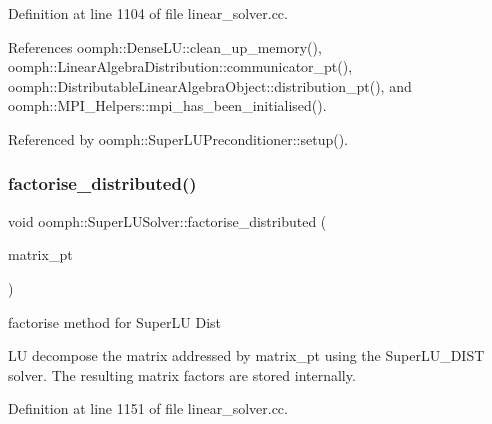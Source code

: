 Definition at line 1104 of file linear\+\_\+solver.\+cc.



References oomph\+::\+Dense\+L\+U\+::clean\+\_\+up\+\_\+memory(), oomph\+::\+Linear\+Algebra\+Distribution\+::communicator\+\_\+pt(), oomph\+::\+Distributable\+Linear\+Algebra\+Object\+::distribution\+\_\+pt(), and oomph\+::\+M\+P\+I\+\_\+\+Helpers\+::mpi\+\_\+has\+\_\+been\+\_\+initialised().



Referenced by oomph\+::\+Super\+L\+U\+Preconditioner\+::setup().

\mbox{\label{classoomph_1_1SuperLUSolver_ab60386fae7cd417ad62f46c3cb1463c0}} 
\subsubsection{\texorpdfstring{factorise\+\_\+distributed()}{factorise\_distributed()}}
{\footnotesize\ttfamily void oomph\+::\+Super\+L\+U\+Solver\+::factorise\+\_\+distributed (\begin{DoxyParamCaption}\item[{\hyperlink{classoomph_1_1DoubleMatrixBase}{Double\+Matrix\+Base} $\ast$const \&}]{matrix\+\_\+pt }\end{DoxyParamCaption})\hspace{0.3cm}{\ttfamily [private]}}



factorise method for Super\+LU Dist 

LU decompose the matrix addressed by matrix\+\_\+pt using the Super\+L\+U\+\_\+\+D\+I\+ST solver. The resulting matrix factors are stored internally. 

Definition at line 1151 of file linear\+\_\+solver.\+cc.



